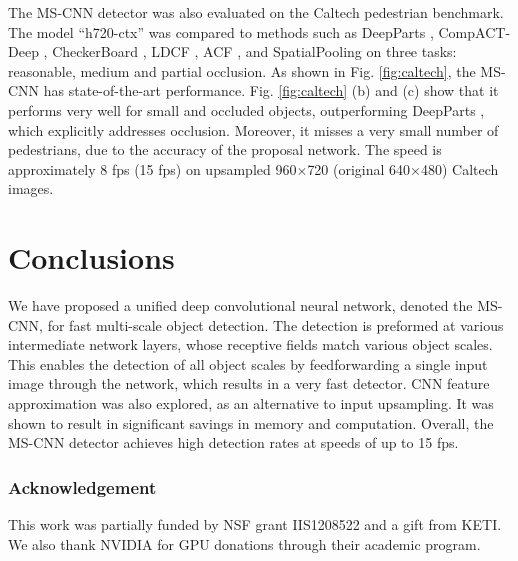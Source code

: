 \documentclass[runningheads]{llncs}
\begin{document}
The MS-CNN detector was also evaluated on the Caltech pedestrian benchmark. The  model ``h720-ctx'' was compared to methods such as
DeepParts \cite{DBLP:conf/iccv/TianLWT15},
CompACT-Deep \cite{DBLP:conf/iccv/CaiSV15},
CheckerBoard \cite{DBLP:conf/cvpr/ZhangBS15},
LDCF \cite{DBLP:conf/nips/NamDH14}, ACF \cite{DBLP:journals/pami/DollarABP14},
and SpatialPooling \cite{DBLP:journals/corr/PaisitkriangkraiSH14b} on
three tasks: reasonable, medium and partial occlusion. As shown in
Fig. \ref{fig:caltech}, the MS-CNN has state-of-the-art performance.
Fig. \ref{fig:caltech} (b) and (c) show that it performs very well for small
and occluded objects, outperforming DeepParts \cite{DBLP:conf/iccv/TianLWT15},
which explicitly addresses occlusion. Moreover, it misses a very small
number of pedestrians, due to the accuracy of the proposal network.
The speed is approximately 8 fps (15 fps) on upsampled
960$\times$720 (original 640$\times$480) Caltech images.


\section{Conclusions}

We have proposed a unified deep convolutional neural network, denoted the
MS-CNN, for fast multi-scale object detection. The detection is preformed at various intermediate network layers, whose receptive fields match
various object scales. This enables the detection of all object scales
by feedforwarding a single input image through the network,
which results in a very fast detector. CNN feature approximation was also
explored, as an alternative to input upsampling. It was shown to
result in significant savings in memory and computation. Overall,
the MS-CNN detector achieves high detection rates at speeds of up to 15 fps.

\subsubsection{Acknowledgement}
This work was partially funded by NSF grant IIS1208522 and a gift from KETI. We also thank NVIDIA for GPU donations through their academic program.

\clearpage



\end{document}
